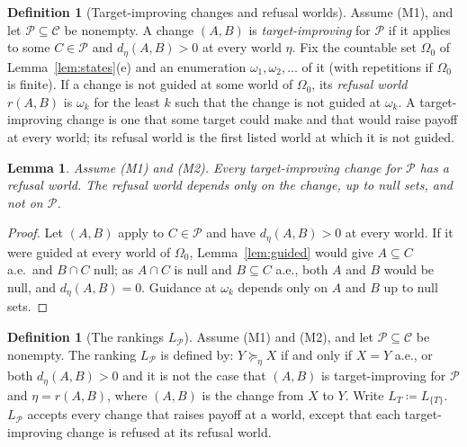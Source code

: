 \documentclass[11pt]{article}
\newtheorem{lemma}[theorem]{Lemma}
\theoremstyle{definition}
\newtheorem{definition}[theorem]{Definition}
\newcommand{\C}{\mathcal C}
\newcommand{\Pc}{\mathcal P}
\begin{document}
\begin{definition}[Target-improving changes and refusal worlds]\label{def:refusal}
Assume (M1), and let $\Pc\subseteq\C$ be nonempty. A change $(A,B)$ is \emph{target-improving} for $\Pc$ if it applies to some $C\in\Pc$ and $d_\eta(A,B)>0$ at every world $\eta$. Fix the countable set $\Omega_0$ of Lemma~\ref{lem:states}(e) and an enumeration $\omega_1,\omega_2,\dots$ of it (with repetitions if $\Omega_0$ is finite). If a change is not guided at some world of $\Omega_0$, its \emph{refusal world} $r(A,B)$ is $\omega_k$ for the least $k$ such that the change is not guided at $\omega_k$. A target-improving change is one that some target could make and that would raise payoff at every world; its refusal world is the first listed world at which it is not guided.
\end{definition}

\begin{lemma}\label{lem:refusal}
Assume (M1) and (M2). Every target-improving change for $\Pc$ has a refusal world. The refusal world depends only on the change, up to null sets, and not on $\Pc$.
\end{lemma}
\begin{proof}
Let $(A,B)$ apply to $C\in\Pc$ and have $d_\eta(A,B)>0$ at every world. If it were guided at every world of $\Omega_0$, Lemma~\ref{lem:guided} would give $A\subseteq C$ a.e.\ and $B\cap C$ null; as $A\cap C$ is null and $B\subseteq C$ a.e., both $A$ and $B$ would be null, and $d_\eta(A,B)=0$. Guidance at $\omega_k$ depends only on $A$ and $B$ up to null sets.
\end{proof}

\begin{definition}[The rankings $L_\Pc$]\label{def:LP}
Assume (M1) and (M2), and let $\Pc\subseteq\C$ be nonempty. The ranking $L_\Pc$ is defined by: $Y\succeq_\eta X$ if and only if $X=Y$ a.e., or both $d_\eta(A,B)>0$ and it is not the case that $(A,B)$ is target-improving for $\Pc$ and $\eta=r(A,B)$, where $(A,B)$ is the change from $X$ to $Y$. Write $L_T\coloneqq L_{\{T\}}$. $L_\Pc$ accepts every change that raises payoff at a world, except that each target-improving change is refused at its refusal world.
\end{definition}
\end{document}
